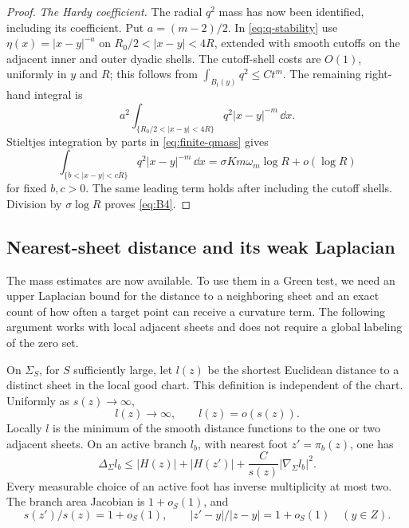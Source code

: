 \begin{proof}
\emph{The Hardy coefficient.}
The radial $q^2$ mass has now been identified, including its coefficient.
Put \(a=(m-2)/2\). In \eqref{eq:q-stability} use
\(\eta(x)=|x-y|^{-a}\) on \(R_0/2<|x-y|<4R\), extended with
smooth cutoffs on the adjacent inner and outer dyadic shells.
The cutoff-shell costs are \(O(1)\), uniformly in \(y\) and \(R\);
this follows from \(\int_{B_t(y)}q^2\le Ct^m\).
The remaining right-hand integral is
\[
 a^2\int_{\{R_0/2<|x-y|<4R\}}q^2|x-y|^{-m}\,\dd x.
\]
Stieltjes integration by parts in \eqref{eq:finite-qmass} gives
\[
 \int_{\{b<|x-y|<cR\}}q^2|x-y|^{-m}\,\dd x
 =\sigma K m\omega_m\log R+o(\log R)
\]
for fixed \(b,c>0\).  The same leading term holds after including
the cutoff shells.  Division by \(\sigma\log R\) proves
\eqref{eq:B4}.
\end{proof}

\subsection{Nearest-sheet distance and its weak Laplacian}

The mass estimates are now available.  To use them in a Green test, we
need an upper Laplacian bound for the distance to a neighboring sheet
and an exact count of how often a target point can receive a curvature
term.  The following argument works with local adjacent sheets and does
not require a global labeling of the zero set.

\begin{lemma}\label{lem:finite-gap}
On \(\Sigma_S\), for \(S\) sufficiently large, let \(l(z)\) be the
shortest Euclidean distance to a distinct sheet in the local good chart.
This definition is independent of the chart.  Uniformly as \(s(z)\to\infty\),
\[
 l(z)\longrightarrow\infty,\qquad l(z)=o(s(z)).
\]
Locally \(l\) is the minimum of the smooth distance functions to the
one or two adjacent sheets.  On an active branch \(l_b\), with nearest
foot \(z'=\pi_b(z)\), one has
\begin{equation}\label{eq:B5}
 \Delta_\Sigma l_b
 \le |H(z)|+|H(z')|+\frac{C}{s(z)}|\nabla_\Sigma l_b|^2.
\end{equation}
Every measurable choice of an active foot has inverse multiplicity at
most two.  The branch area Jacobian is \(1+o_S(1)\), and
\[
 s(z')/s(z)=1+o_S(1),\qquad
 |z'-y|/|z-y|=1+o_S(1)\quad(y\in Z).
\]
\end{lemma}

